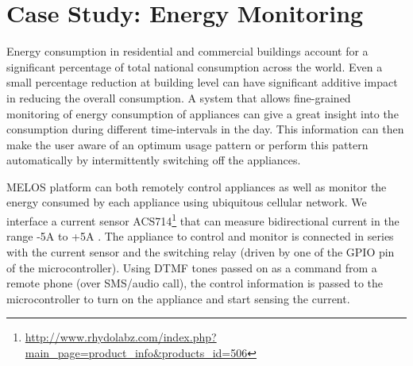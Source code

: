 \documentclass[10pt]{sigplan-proc-varsize}
\newcommand{\redcolor}[1]{\textcolor{red}{#1}}
\newcommand{\melos}{MELOS }
\begin{document}
\section{Case Study: Energy Monitoring}
\label{sec:case}
Energy consumption in residential and commercial buildings account for a significant percentage of total national consumption across the world.  Even a small percentage reduction at building level can have significant additive impact in reducing the overall consumption. A system that allows fine-grained monitoring of energy consumption of appliances can give a great insight into the consumption during different time-intervals in the day. This information can then make the user aware of an optimum usage pattern or perform this pattern automatically by intermittently switching off the appliances.

\melos platform can both remotely control appliances as well as monitor the energy consumed by each appliance using ubiquitous cellular network. We interface a current sensor ACS714\footnote{\url{http://www.rhydolabz.com/index.php?main_page=product_info&products_id=506}} that can  measure bidirectional current in the range -5A to +5A . The appliance to control and monitor is connected in series with the current sensor and the switching relay (driven by one of the GPIO pin of the microcontroller). Using DTMF tones passed on as a command from a remote phone (over SMS/audio call), the control information is passed to the microcontroller to turn on the appliance and start sensing the current.

\begin{figure*}
\centering
{}
\caption{Energy consumption of different appliances as monitored by \melos}
\label{fig:energychart}
\vspace{-5mm}
\end{figure*}

\end{document}

